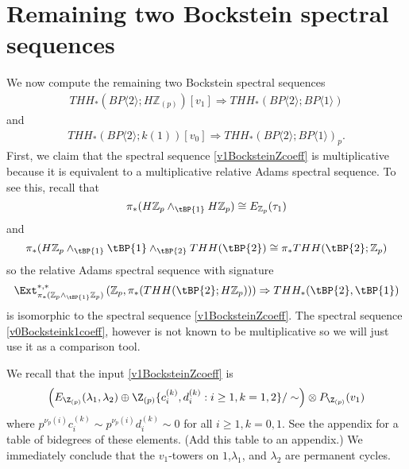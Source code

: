
\section{Remaining two Bockstein spectral sequences}

We now compute the remaining two Bockstein spectral sequences 
\begin{align}
\label{v1BocksteinZcoeff}THH_*(BP\langle 2\rangle ;H\mathbb{Z}_{(p)})[v_1]\Rightarrow THH_*(BP\langle 2\rangle ;BP\langle 1 \rangle )
\end{align}
and 
\begin{align}
\label{v0Bocksteink1coeff} THH_*(BP\langle 2\rangle ;k(1))[v_0]\Rightarrow THH_*(BP\langle 2\rangle ;BP\langle 1\rangle )_p.
\end{align}
First, we claim that the spectral sequence \eqref{v1BocksteinZcoeff} is multiplicative because it is equivalent to a multiplicative relative Adams spectral sequence. To see this, recall that 
\[ \pi_*(H\mathbb{Z}_p\wedge_{\tBP{1}}H\mathbb{Z}_p)\cong E_{\mathbb{Z}_p}(\tau_1)\]
and 
\[\pi_*(H\mathbb{Z}_p\wedge _{\tBP{1}}\tBP{1}\wedge_{\tBP{2}}THH(\tBP{2})\cong \pi_*THH(\tBP{2};\mathbb{Z}_p)\]
so the relative Adams spectral sequence with signature
\[ \Ext_{ \pi_*(\mathbb{Z}_p\wedge_{\tBP{1}}\mathbb{Z}_p)}^{*,*}\left (\mathbb{Z}_p, \pi_*(THH(\tBP{2};H\mathbb{Z}_p))\right )\Rightarrow THH_*(\tBP{2},\tBP{1})\]
is isomorphic to the spectral sequence \eqref{v1BocksteinZcoeff}.
The spectral sequence \eqref{v0Bocksteink1coeff}, however is not known to be multiplicative so we will just use it as a comparison tool. 

We recall that the input \eqref{v1BocksteinZcoeff} is 
\[ \left ( E_{\Z_{(p)}}(\lambda_1,\lambda_2)\oplus \Z_{(p)}\{c_i^{(k)},d_i^{(k)} : i\ge 1,k=1,2 \}/\sim \right ) \otimes P_{\Z_{(p)}}(v_1)\] 
where $p^{\nu_p(i)}c_i^{(k)}\sim p^{\nu_p(i)}d_i^{(k)}\sim 0$ for all  $i\ge 1,k=0,1$. See the appendix for a table of bidegrees of these elements.  (Add this table to an appendix.)
We immediately conclude that the $v_1$-towers on $1$,$\lambda_1$, and $\lambda_2$ are permanent cycles. 

